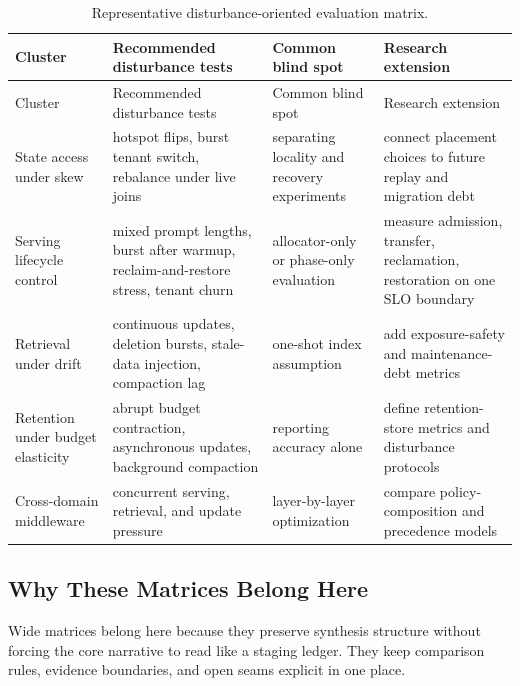 \begin{longtable}{>{\raggedright\arraybackslash}p{}>{\raggedright\arraybackslash}p{}>{\raggedright\arraybackslash}p{}>{\raggedright\arraybackslash}p{}}
\caption{Representative disturbance-oriented evaluation matrix.}\\
\toprule
Cluster & Recommended disturbance tests & Common blind spot & Research extension \\
\midrule
\endfirsthead
\toprule
Cluster & Recommended disturbance tests & Common blind spot & Research extension \\
\midrule
\endhead
State access under skew & hotspot flips, burst tenant switch, rebalance under live joins & separating locality and recovery experiments & connect placement choices to future replay and migration debt \\

Serving lifecycle control & mixed prompt lengths, burst after warmup, reclaim-and-restore stress, tenant churn & allocator-only or phase-only evaluation & measure admission, transfer, reclamation, restoration on one SLO boundary \\

Retrieval under drift & continuous updates, deletion bursts, stale-data injection, compaction lag & one-shot index assumption & add exposure-safety and maintenance-debt metrics \\

Retention under budget elasticity & abrupt budget contraction, asynchronous updates, background compaction & reporting accuracy alone & define retention-store metrics and disturbance protocols \\

Cross-domain middleware & concurrent serving, retrieval, and update pressure & layer-by-layer optimization & compare policy-composition and precedence models \\
\bottomrule
\end{longtable}

\subsection{Why These Matrices Belong Here}

Wide matrices belong here because they preserve synthesis structure without forcing the core narrative to read like a staging ledger. They keep comparison rules, evidence boundaries, and open seams explicit in one place.
